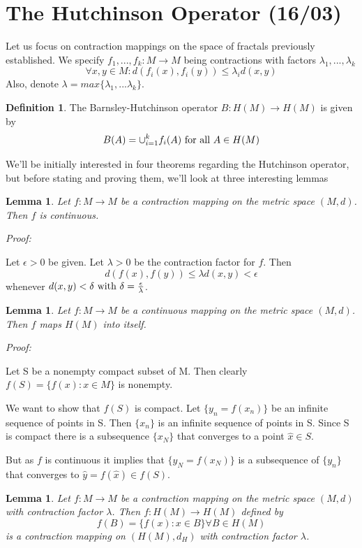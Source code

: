 \documentclass[a4paper]{article}
\theoremstyle{plain}
\newtheorem{lemma}[theorem]{Lemma}
\theoremstyle{definition}
\newtheorem{defn}[theorem]{Definition}%
\begin{document}
\section{The Hutchinson Operator (16/03)}
Let us focus on contraction mappings on the space of fractals previously established. We specify $f_1,...,f_k: M\rightarrow M$ being contractions with factors $\lambda_1, ..., \lambda_k$
$$\forall x,y \in M: d(f_i(x),f_i(y)) \leq \lambda_i d(x,y)$$
Also, denote $\lambda = max\{\lambda_1,...\lambda_k\}$.
\begin{defn}
    The Barnsley-Hutchinson operator $B:H(M) \rightarrow H(M)$ is given by
    $$B(A) = \cup^k_{i=1}f_i(A) \textnormal{ for all } A \in H(M)$$
\end{defn}

We'll be initially interested in four theorems regarding the Hutchinson operator, but before stating and proving them, we'll look at three interesting lemmas

\begin{lemma}
Let $f:M\rightarrow M$ be a contraction mapping on the metric space $(M,d)$. Then $f$ is continuous.
\end{lemma}
\textit{Proof:}

Let $\epsilon > 0$ be given. Let $\lambda > 0$ be the contraction factor for $f$. Then
$$d(f(x),f(y)) \leq \lambda d(x,y) < \epsilon$$
whenever $d(x,y) < \delta \textnormal{ with } \delta=\frac{\epsilon}{\lambda}$. \\ \qedsymbol

\begin{lemma}
    Let $f:M\rightarrow M$ be a continuous mapping on the metric space $(M,d)$. Then $f$ maps $H(M)$ into itself.
\end{lemma}

\textit{Proof:}

Let S be a nonempty compact subset of M. Then clearly $f(S) = \{f(x): x \in M\}$ is nonempty.

We want to show that $f(S)$ is compact. Let $\{y_n = f(x_n)\}$ be an infinite sequence of points in S. Then $\{x_n\}$ is an infinite sequence of points in S. Since S is compact there is a subsequence $\{x_{N}\}$ that converges to a point $\hat{x} \in S$.

But as $f$ is continuous it implies that $\{y_{N} = f(x_N)\}$ is a subsequence of $\{y_n\}$ that converges to $\hat{y} = f(\hat{x}) \in f(S)$.\\ \qedsymbol

\begin{lemma}
    Let $f:M\rightarrow M$ be a contraction mapping on the metric space $(M,d)$ with contraction factor $\lambda$. Then $f:H(M)\rightarrow H(M)$ defined by
    $$f(B) = \{f(x): x \in B\} \forall B \in H(M)$$
    is a contraction mapping on $(H(M),d_H)$ with contraction factor $\lambda$.
\end{lemma}
\end{document}

